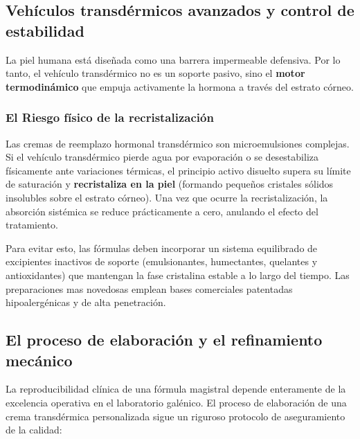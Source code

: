 \documentclass[
  spanish,
]{article}
\begin{document}
\subsection{Vehículos transdérmicos avanzados y control de estabilidad}\label{vehuxedculos-transduxe9rmicos-avanzados-y-control-de-estabilidad}

La piel humana está diseñada como una barrera impermeable defensiva. Por lo tanto, el vehículo transdérmico no es un soporte pasivo, sino el \textbf{motor termodinámico} que empuja activamente la hormona a través del estrato córneo.

\subsubsection{El Riesgo físico de la recristalización}\label{el-riesgo-fuxedsico-de-la-recristalizaciuxf3n}

Las cremas de reemplazo hormonal transdérmico son microemulsiones complejas. Si el vehículo transdérmico pierde agua por evaporación o se desestabiliza físicamente ante variaciones térmicas, el principio activo disuelto supera su límite de saturación y \textbf{recristaliza en la piel} (formando pequeños cristales sólidos insolubles sobre el estrato córneo). Una vez que ocurre la recristalización, la absorción sistémica se reduce prácticamente a cero, anulando el efecto del tratamiento.

Para evitar esto, las fórmulas deben incorporar un sistema equilibrado de excipientes inactivos de soporte (emulsionantes, humectantes, quelantes y antioxidantes) que mantengan la fase cristalina estable a lo largo del tiempo. Las preparaciones mas novedosas emplean bases comerciales patentadas hipoalergénicas y de alta penetración.

\subsection{El proceso de elaboración y el refinamiento mecánico}\label{el-proceso-de-elaboraciuxf3n-y-el-refinamiento-mecuxe1nico}

La reproducibilidad clínica de una fórmula magistral depende enteramente de la excelencia operativa en el laboratorio galénico. El proceso de elaboración de una crema transdérmica personalizada sigue un riguroso protocolo de aseguramiento de la calidad:
\end{document}
